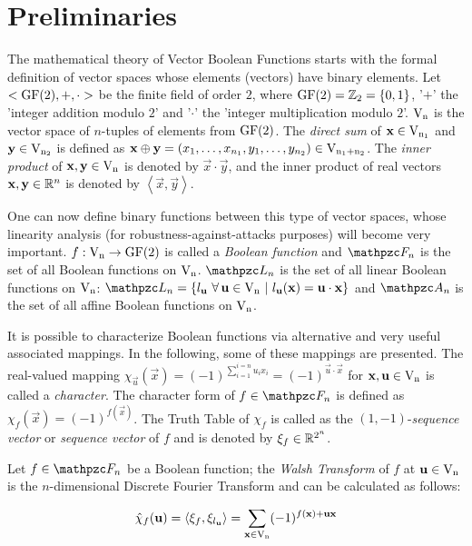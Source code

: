\section{Preliminaries}

The mathematical theory of Vector Boolean Functions starts with the formal
definition of vector spaces whose elements (vectors) have binary elements.
Let $< \gf{GF(2)}, +, \cdot >$ be the finite field of order $2$, where
$\gf{GF(2)} = \bbbz_2 = \{0,1\}$, '$+$' the 'integer addition modulo $2$' and
'$\cdot$' the 'integer multiplication modulo $2$'. $\gf{V_n}$ is the vector
space of $n$-tuples of elements from $\gf{GF(2)}$. The \textsl{direct sum} of
$\vec{x} \in \gf{V_{n_1}}$ and $\vec{y} \in \gf{V_{n_2}}$ is defined as
$\vec{x} \oplus \vec{y}  = (x_1, \ldots, x_{n_1}, y_1, \ldots, y_{n_2}) \in
\gf{V_{n_1+n_2}}$. The \textsl{inner product} of $\vec{x},\vec{y} \in
\gf{V_n}$ is denoted by $\vec{x} \cdot \vec{y}$, and the inner product of real
vectors $\vec{x}, \vec{y} \in \bbbr^n$ is denoted by
$\left\langle\vec{x},\vec{y}\right\rangle$. 

One can now define binary functions 
  between this type of vector spaces, whose 
linearity analysis (for robustness-against-attacks purposes) will become very
important. $f: \gf{V_n} \to \gf{GF(2)}$ is called a \textsl{Boolean function} and
$\funct{F}_n$ is the set of all Boolean functions on $\gf{V_n}$. $\funct{L}_n$
is the set of all linear Boolean functions on $\gf{V_n}$: $\funct{L}_n =
\{l_{\vec{u}} \  \fa \vec{u} \in \gf{V_n} \given l_{\vec{u}}(\vec{x})=\vec{u}
\cdot \vec{x}\}$ and $\funct{A}_n$ is the set of all affine Boolean functions
on $\gf{V_n}$. 

It is possible to characterize Boolean functions via alternative and very
useful associated mappings. In the following, some of these mappings are
presented. The real-valued mapping $\chi_{\vec{u}}(\vec{x})={(-1)}^{\sum_{i=1}^{i=n} u_i
  x_i}={(-1)}^{\vec{u} \cdot \vec{x}}$ for $\vec{x}, \vec{u} \in \gf{V_n}$ is
called a \textsl{character}. The character form of $f \in \funct{F}_n$ is
defined as $\chi_f(\vec{x})=(-1)^{f(\vec{x})}$. The Truth Table of $\chi_f$ is
called as the $(1,-1)$-\textsl{sequence vector} or \textsl{sequence vector} of
$f$ and is denoted by $\xi_f \in \bbbr^{2^n}$. 

Let $f \in \funct{F}_n$ be a Boolean function; the \textsl{Walsh Transform} of
$f$ at $\vec{u} \in \gf{V_n}$ is the $n$-dimensional Discrete Fourier
Transform and can be calculated as follows: 

\begin{equation}\label{WalshTransformInner}
\walsh{\chi}_f(\vec{u}) = \left\langle \xi_f, \xi_{l_{\vec{u}}} \right\rangle = 
\sum_{\vec{x} \in \gf{V_n}} (-1)^{f(\vec{x}) + \vec{u} \vec{x}} 
\end{equation}


